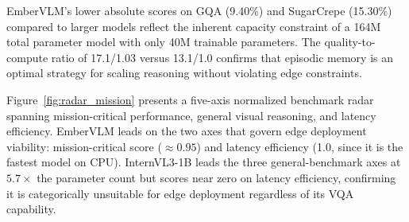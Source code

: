 EmberVLM's lower absolute scores on GQA (9.40\%) and SugarCrepe (15.30\%) compared to larger models reflect the inherent capacity constraint of a 164M total parameter model with only 40M trainable parameters. The quality-to-compute ratio of 17.1/1.03 versus 13.1/1.0 confirms that episodic memory is an optimal strategy for scaling reasoning without violating edge constraints.

Figure~\ref{fig:radar_mission} presents a five-axis normalized benchmark radar spanning mission-critical performance, general visual reasoning, and latency efficiency. EmberVLM leads on the two axes that govern edge deployment viability: mission-critical score (${\approx}0.95$) and latency efficiency (1.0, since it is the fastest model on CPU). InternVL3-1B leads the three general-benchmark axes at $5.7\times$ the parameter count but scores near zero on latency efficiency, confirming it is categorically unsuitable for edge deployment regardless of its VQA capability.

